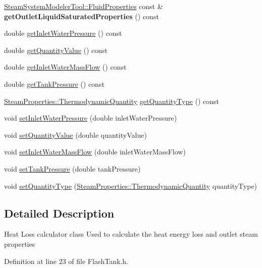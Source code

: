 \begin{DoxyCompactItemize}
\mbox{\label{class_flash_tank_af65a272b08ca55e4e97b3a00c952a6e7}} 
\hyperlink{struct_steam_system_modeler_tool_1_1_fluid_properties}{Steam\+System\+Modeler\+Tool\+::\+Fluid\+Properties} const  \& {\bfseries get\+Outlet\+Liquid\+Saturated\+Properties} () const
\item 
double \hyperlink{class_flash_tank_a62e8ff97d91da0845526c494022e41da}{get\+Inlet\+Water\+Pressure} () const
\item 
double \hyperlink{class_flash_tank_ab2145598969881df58736a1b65326d17}{get\+Quantity\+Value} () const
\item 
double \hyperlink{class_flash_tank_a2b6dcd9e175a9f2fc550ea91006aa66a}{get\+Inlet\+Water\+Mass\+Flow} () const
\item 
double \hyperlink{class_flash_tank_af5d4f0bf7babe61120e1e4452594e1af}{get\+Tank\+Pressure} () const
\item 
\hyperlink{class_steam_properties_ae0294bedf7d178c2d8fb6aed0f62fbff}{Steam\+Properties\+::\+Thermodynamic\+Quantity} \hyperlink{class_flash_tank_a1800317a9b9dd8ff8fb18c693e846a45}{get\+Quantity\+Type} () const
\item 
void \hyperlink{class_flash_tank_aed0991a7902401d110fb2f4b472326f5}{set\+Inlet\+Water\+Pressure} (double inlet\+Water\+Pressure)
\item 
void \hyperlink{class_flash_tank_ac7392743aeaf8de6ce368814ea42e236}{set\+Quantity\+Value} (double quantity\+Value)
\item 
void \hyperlink{class_flash_tank_a2bcbd92d39ef3c760bdd65066ba3d34a}{set\+Inlet\+Water\+Mass\+Flow} (double inlet\+Water\+Mass\+Flow)
\item 
void \hyperlink{class_flash_tank_a8b3bb51a62dac4f76284dfdc114d83fe}{set\+Tank\+Pressure} (double tank\+Pressure)
\item 
void \hyperlink{class_flash_tank_a30aa7a42d1547f61b176da4a15e8e8ee}{set\+Quantity\+Type} (\hyperlink{class_steam_properties_ae0294bedf7d178c2d8fb6aed0f62fbff}{Steam\+Properties\+::\+Thermodynamic\+Quantity} quantity\+Type)
\end{DoxyCompactItemize}


\subsection{Detailed Description}
Heat Loss calculator class Used to calculate the heat energy loss and outlet steam properties 

Definition at line 23 of file Flash\+Tank.\+h.



